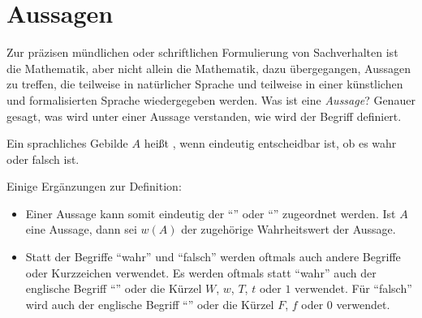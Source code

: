 \section{Aussagen}
\label{sec:ElemLogik-Aussagen}


\begin{Unit}
Zur präzisen mündlichen oder schriftlichen Formulierung von Sachverhalten ist 
die Mathematik, aber nicht allein die Mathematik, dazu übergegangen, Aussagen 
zu treffen, die teilweise in natürlicher Sprache und teilweise in einer 
künstlichen und formalisierten Sprache wiedergegeben werden. Was ist eine
\emph{Aussage}? Genauer gesagt, was wird unter einer Aussage verstanden, wie 
wird der Begriff definiert.

\begin{Definition}
Ein sprachliches Gebilde $A$ heißt , wenn eindeutig 
entscheidbar ist, ob es wahr oder falsch ist. 
\end{Definition}

Einige Ergänzungen zur Definition:
\begin{itemize}

\item Einer Aussage kann somit eindeutig der 
  \enquote{} oder \enquote{} zugeordnet werden. 
  Ist $A$ eine Aussage, dann sei $w(A)$ der zugehörige Wahrheitswert der 
  Aussage.

\item Statt der Begriffe \enquote{wahr} und \enquote{falsch} werden oftmals 
  auch andere Begriffe oder Kurzzeichen verwendet. Es werden oftmals statt
  \enquote{wahr} auch der englische Begriff \enquote{} oder die   
  Kürzel $W$, $w$, $T$, $t$ oder $1$ verwendet. Für \enquote{falsch} wird 
  auch der englische Begriff \enquote{} oder die Kürzel $F$, 
  $f$ oder $0$ verwendet. 


\end{itemize}
\end{Unit}
